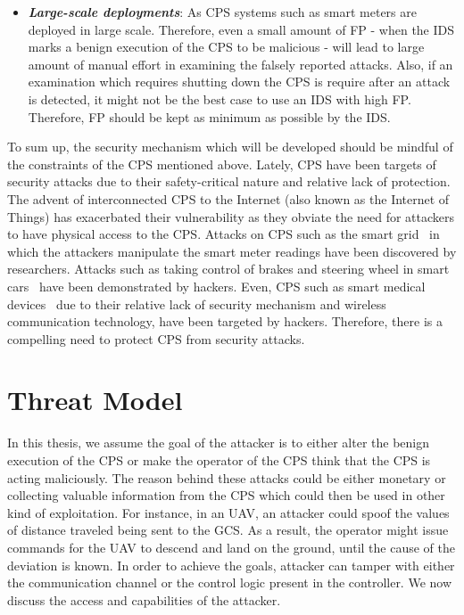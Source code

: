\begin{itemize}
\item \textbf{\textit{Large-scale deployments}}: As \ac{CPS} systems such as smart meters are deployed in large scale. Therefore, even a small amount of \acf{FP} - when the \ac{IDS} marks a benign execution of the \ac{CPS} to be malicious - will lead to large amount of manual effort in examining the falsely reported attacks. Also, if an examination which requires shutting down the \ac{CPS} is require after an attack is detected, it might not be the best case to use an \ac{IDS} with high \ac{FP}. Therefore, \ac{FP} should be kept as minimum as possible by the \ac{IDS}.

\end{itemize}
To sum up, the security mechanism which will be developed should be mindful of the constraints of the \ac{CPS} mentioned above. Lately, \ac{CPS} have been targets of security attacks due to their safety-critical nature and relative lack of protection. The advent of interconnected \ac{CPS} to the Internet (also known as the Internet of Things) has exacerbated their vulnerability as they obviate the need for attackers to have physical access to the \ac{CPS}. Attacks on \ac{CPS} such as the smart grid~\cite{skopik2012survey, liu2012cyber} in which the attackers manipulate the smart meter readings have been discovered by researchers. Attacks such as taking control of brakes and steering wheel in smart cars~\cite{checkoway2011comprehensive, woo2015practical} have been demonstrated by hackers. Even, \ac{CPS} such as smart medical devices~\cite{leavitt2010researchers, radcliffe2011hacking} due to their relative lack of security mechanism and wireless communication technology, have been targeted by hackers. Therefore, there is a compelling need to protect \ac{CPS} from security attacks. 


\section{Threat Model}
\label{sec:threatModel}
In this thesis, we assume the goal of the attacker is to either alter the benign execution of the \ac{CPS} or make the operator of the \ac{CPS} think that the \ac{CPS} is acting maliciously. The reason behind these attacks could be either monetary or collecting valuable information from the \ac{CPS} which could then be used in other kind of exploitation. For instance, in an \ac{UAV}, an attacker could spoof the values of distance traveled being sent to the \ac{GCS}. As a result, the operator might issue commands for the \ac{UAV} to descend and land on the ground, until the cause of the deviation is known. In order to achieve the goals, attacker can tamper with either the communication channel or the control logic present in the controller. We now discuss the access and capabilities of the attacker.

